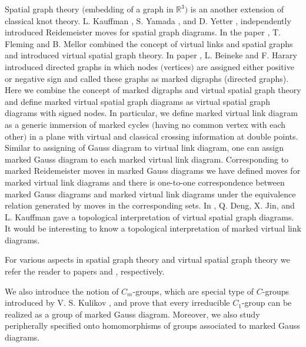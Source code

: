 \documentclass[11 pt, reqno]{amsart}
\theoremstyle{definition}
\numberwithin{equation}{subsection}
\begin{document}
Spatial graph theory $($embedding of a graph in $\mathbb{R}^3)$ is an another extension of classical knot theory. L. Kauffman \cite{Kauffman-2}, S. Yamada \cite{Yamada-1}, and D. Yetter \cite{Yetter-1}, independently introduced Reidemeister moves for spatial graph diagrams. In the paper \cite{FM-1}, T. Fleming and B. Mellor combined the concept of virtual links and spatial graphs and introduced virtual spatial graph theory. In paper \cite{BH-1}, L. Beineke and F. Harary introduced directed graphs in which nodes $($vertices$)$ are assigned either positive or negative sign and called these graphs as marked digraphs (directed graphs). Here we combine the concept of marked digraphs and virtual spatial graph theory and define marked virtual spatial graph diagrams as virtual spatial graph diagrams with signed nodes. In particular, we define marked virtual link diagram as a generic immersion of marked cycles $($having no common vertex with each other$)$ in a plane with virtual and classical crossing information at double points. Similar to assigning of Gauss diagram to virtual link diagram, one can assign marked Gauss diagram to each marked virtual link diagram. Corresponding to marked Reidemeister moves in marked Gauss diagrams we have defined moves for marked virtual link diagrams and there is one-to-one correspondence between marked Gauss diagrams and marked virtual link diagrams under the equivalence relation generated by moves in the corresponding sets. In \cite{DJK-1}, Q. Deng, X. Jin, and L. Kauffman gave a topological interpretation of virtual spatial graph diagrams. It would be interesting to know a topological interpretation of marked virtual link diagrams. 
\par 
For various aspects in spatial graph theory and virtual spatial graph theory we refer the reader to papers \cite{BK-1, Hanaki-1, KT-1, Kauffman-2, KKKP-1, LLLV-1, Murakami-1, Yamada-1, Yetter-1} and \cite{ DJK-1,FM-1, FM-2, KM-1, Miyazawa-1}, respectively.
\par

We also introduce the notion of $C_m$-groups, which are special type of $C$-groups introduced by V. S. Kulikov \cite{Kulikov-1}, and prove that every irreducible $C_1$-group can be realized as a group of marked Gauss diagram. Moreover, we also study peripherally specified onto homomorphisms of groups associated to marked Gauss diagrams. 
\par 
\end{document}
